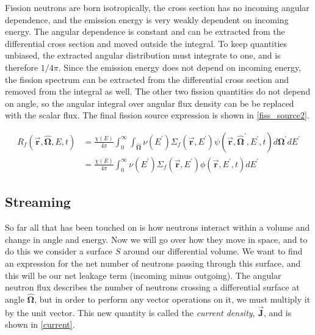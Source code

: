  Fission neutrons are born isotropically, the cross section has no incoming angular dependence, and the emission energy is very weakly dependent on incoming energy.  The angular dependence is constant and can be extracted from the differential cross section and moved outside the integral.  To keep quantities unbiased, the extracted angular distribution must integrate to one, and is therefore $1/4\pi$.  Since the emission energy does not depend on incoming energy, the fission spectrum can be extracted from the differential cross section and removed from the integral as well.  The other two fission quantities do not depend on angle, so the angular integral over angular flux density can be be replaced with the scalar flux.  The final fission source expression is shown in \eqref{fiss_source2}.

\begin{equation}
\label{fiss_source2}
\begin{split}
R_f(\boldsymbol{\vec{r}},\boldsymbol{\hat{\Omega}},E,t) & = \frac{\chi(E)}{4\pi} \int_0^\infty  \int_{\boldsymbol{\hat{\Omega}}}   \nu(E^\prime) \Sigma_f(\boldsymbol{\vec{r}},E^\prime) \psi(\boldsymbol{\vec{r}},\boldsymbol{\hat{\Omega}}^\prime,E^\prime,t) d\boldsymbol{\Omega}^\prime  dE^\prime \\
&= \frac{\chi(E)}{4\pi} \int_0^\infty   \nu(E^\prime) \Sigma_f(\boldsymbol{\vec{r}},E^\prime) \phi(\boldsymbol{\vec{r}},E^\prime,t)  dE^\prime
\end{split}
 \end{equation}


\subsection{Streaming}

So far all that has been touched on is how neutrons interact within a volume and change in angle and energy.  Now we will go over how they move in space, and to do this we consider a surface $S$ around our differential volume.  We want to find an expression for the net number of neutrons passing through this surface, and this will be our net leakage term (incoming minus outgoing).  The angular neutron flux describes the number of neutrons crossing a differential surface at angle $\boldsymbol{\hat{\Omega}}$, but in order to perform any vector operations on it, we must multiply it by the unit vector.  This new quantity is called the \emph{current density}, $\vec{\boldsymbol{J}}$, and is shown in \eqref{current}.

